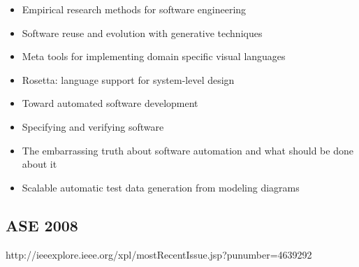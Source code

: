 {\begin{itemize}[itemsep=-1ex]
  \item Empirical research methods for software engineering
  \item Software reuse and evolution with generative techniques
  \item Meta tools for implementing domain specific visual languages
  \item Rosetta: language support for system-level design
  \item Toward automated software development
  \item Specifying and verifying software
  \item The embarrassing truth about software automation and what should be done about it
  \item Scalable automatic test data generation from modeling diagrams
\end{itemize}
}

\subsection{ASE 2008}

http://ieeexplore.ieee.org/xpl/mostRecentIssue.jsp?punumber=4639292

